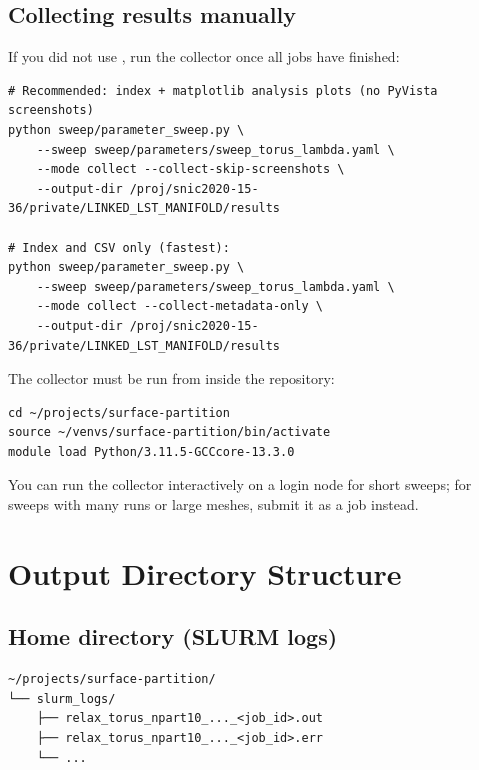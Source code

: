 \documentclass[11pt,a4paper]{article}
\begin{document}
\subsection{Collecting results manually}

If you did not use , run the collector once all jobs
have finished:

\begin{lstlisting}[style=shell]
# Recommended: index + matplotlib analysis plots (no PyVista screenshots)
python sweep/parameter_sweep.py \
    --sweep sweep/parameters/sweep_torus_lambda.yaml \
    --mode collect --collect-skip-screenshots \
    --output-dir /proj/snic2020-15-36/private/LINKED_LST_MANIFOLD/results

# Index and CSV only (fastest):
python sweep/parameter_sweep.py \
    --sweep sweep/parameters/sweep_torus_lambda.yaml \
    --mode collect --collect-metadata-only \
    --output-dir /proj/snic2020-15-36/private/LINKED_LST_MANIFOLD/results
\end{lstlisting}

\begin{notebox}
The collector must be run from inside the repository:
\begin{lstlisting}[style=shell]
cd ~/projects/surface-partition
source ~/venvs/surface-partition/bin/activate
module load Python/3.11.5-GCCcore-13.3.0
\end{lstlisting}
You can run the collector interactively on a login node for short sweeps;
for sweeps with many runs or large meshes, submit it as a job instead.
\end{notebox}

\section{Output Directory Structure}

\subsection{Home directory (SLURM logs)}

\begin{lstlisting}[style=shell]
~/projects/surface-partition/
└── slurm_logs/
    ├── relax_torus_npart10_..._<job_id>.out
    ├── relax_torus_npart10_..._<job_id>.err
    └── ...
\end{lstlisting}
\end{document}
